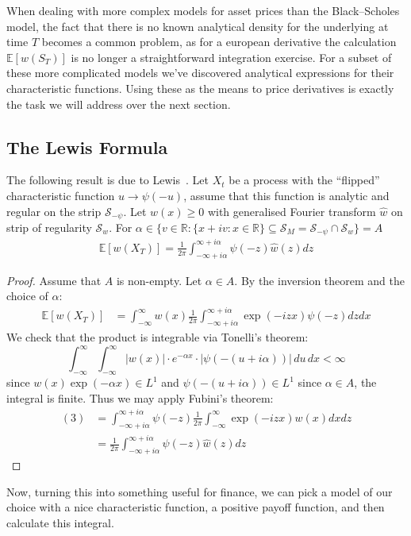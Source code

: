 
When dealing with more complex models for asset prices than the Black--Scholes model, the fact that there is no known analytical
density for the underlying at time $T$ becomes a common problem, as for a european derivative the calculation $\mathbb{E}[w(S_T)]$ is
no longer a straightforward integration exercise. For a subset of these more complicated models we've discovered analytical
expressions for their characteristic functions. Using these as the means to price derivatives is exactly the task we will address over the next section.

\subsection{The Lewis Formula}
The following result is due to Lewis~\cite{lewis2001}.
Let $X_t$ be a process with the ``flipped'' characteristic function $u\to\psi(-u)$, assume that this function is analytic and regular on the strip $\mathcal{S}_{-\psi}$.
Let $w(x)\geq0$ with generalised Fourier transform $\hat{w}$ on strip of regularity $\mathcal{S}_w$. For
$\alpha\in \{v\in\mathbb{R} : \{x+i v:x\in\mathbb{R}\}\subseteq \mathcal{S}_M=\mathcal{S}_{-\psi} \cap \mathcal{S}_w\}=A$
\begin{align}
\mathbb{E}[w(X_T)] = \frac{1}{2\pi}\int_{-\infty+i\alpha}^{\infty+i\alpha}\psi(-z)\hat{w}(z) dz
\end{align}
\begin{proof}
Assume that $A$ is non-empty.
Let $\alpha\in A$.
By the inversion theorem and the choice of $\alpha$:
\begin{align}
\mathbb{E}[w(X_T)]&=\int_{-\infty}^{\infty}w(x)\frac{1}{2\pi}\int_{-\infty+i\alpha}^{\infty+i\alpha}\exp(-izx)\psi(-z) dzdx
\end{align}
We check that the product is integrable via Tonelli's theorem:
\begin{equation}\int_{-\infty}^{\infty} \int_{-\infty}^{\infty}
|w(x)| \cdot e^{-\alpha x} \cdot |\psi(-(u+i\alpha))|\, du\, dx < \infty\end{equation}
since $w(x)\exp(-\alpha x)\in L^1$ and $\psi(-(u+i\alpha))\in L^1$
since $\alpha\in A$, the integral is finite.
Thus we may apply Fubini's theorem:
\begin{align}
(3)&=\int_{-\infty+i\alpha}^{\infty+i\alpha}\psi(-z)\frac{1}{2\pi}\int_{-\infty}^{\infty}\exp(-izx)w(x) dxdz \\
&=\frac{1}{2\pi}\int_{-\infty+i\alpha}^{\infty+i\alpha}\psi(-z)\hat{w}(z) dz\quad
\end{align}
\end{proof}
Now, turning this into something useful for finance, we can pick a model of our choice with a nice characteristic function, a positive payoff function, and then calculate this integral.

